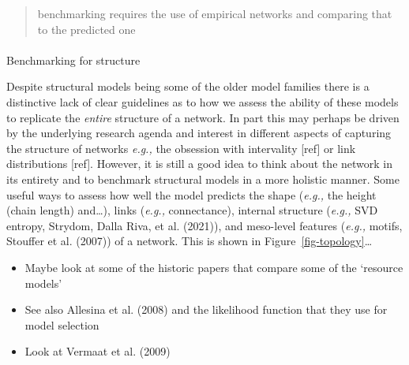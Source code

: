 \documentclass[
]{article}
\makeatletter
\let\oldparagraph\paragraph
\renewcommand{\paragraph}{
    \@ifstar
      \xxxParagraphStar
      \xxxParagraphNoStar
  }
\newcommand{\xxxParagraphStar}[1]{\oldparagraph*{#1}\mbox{}}
\newcommand{\xxxParagraphNoStar}[1]{\oldparagraph{#1}\mbox{}}
\makeatother
\begin{document}
\begin{quote}
benchmarking requires the use of empirical networks and comparing that
to the predicted one
\end{quote}

\paragraph{Benchmarking for structure}\label{benchmarking-for-structure}

Despite structural models being some of the older model families there
is a distinctive lack of clear guidelines as to how we assess the
ability of these models to replicate the \emph{entire} structure of a
network. In part this may perhaps be driven by the underlying research
agenda and interest in different aspects of capturing the structure of
networks \emph{e.g.,} the obsession with intervality {[}ref{]} or link
distributions {[}ref{]}. However, it is still a good idea to think about
the network in its entirety and to benchmark structural models in a more
holistic manner. Some useful ways to assess how well the model predicts
the shape (\emph{e.g.,} the height (chain length) and\ldots), links
(\emph{e.g.,} connectance), internal structure (\emph{e.g.,} SVD
entropy, Strydom, Dalla Riva, et al. (2021)), and meso-level features
(\emph{e.g.,} motifs, Stouffer et al. (2007)) of a network. This is
shown in Figure~\ref{fig-topology}\ldots{}

\begin{itemize}
\item
  Maybe look at some of the historic papers that compare some of the
  `resource models'
\item
  See also Allesina et al. (2008) and the likelihood function that they
  use for model selection
\item
  Look at Vermaat et al. (2009)
\end{itemize}
\end{document}
